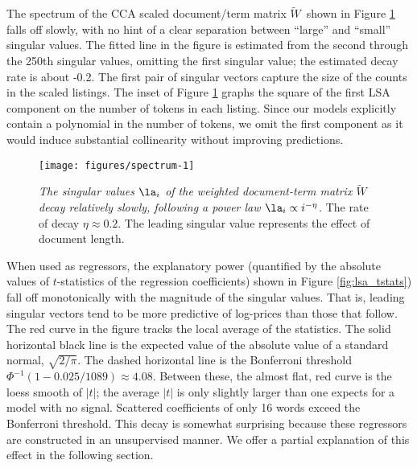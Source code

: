 \documentclass[12pt]{article}\usepackage[]{graphicx}\usepackage[]{color}
\makeatletter
\newenvironment{kframe}{%
 \def\at@end@of@kframe{}%
 \ifinner\ifhmode%
  \def\at@end@of@kframe{\end{minipage}}%
  \begin{minipage}{\columnwidth}%
 \fi\fi%
 \def\FrameCommand##1{\hskip\@totalleftmargin \hskip-\fboxsep
 \colorbox{shadecolor}{##1}\hskip-\fboxsep
     \hskip-\linewidth \hskip-\@totalleftmargin \hskip\columnwidth}%
 \MakeFramed {\advance\hsize-\width
   \@totalleftmargin\z@ \linewidth\hsize
   \@setminipage}}%
 {\par\unskip\endMakeFramed%
 \at@end@of@kframe}
\newenvironment{knitrout}{}{} %
\newcommand{\Wt}{\mbox{$\widetilde{W}$}}
\makeatother
\begin{document}
 The spectrum of the CCA scaled document/term matrix \Wt\ shown in
 Figure \ref{fig:spectrum} falls off slowly, with no hint of a clear
 separation between ``large'' and ``small'' singular values.  The
 fitted line in the figure is estimated from the second through the
 250th singular values, omitting the first singular value; the
 estimated decay rate is about -0.2.  The first pair of singular
 vectors capture the size of the counts in the scaled listings. The
 inset of Figure \ref{fig:spectrum} graphs the square of the first LSA
 component on the number of tokens in each listing.  Since our models
 explicitly contain a polynomial in the number of tokens, we omit the
 first component as it would induce substantial collinearity without
 improving predictions.


\begin{figure}
\begin{knitrout}
\color{fgcolor}

{\centering \texttt{[image: figures/spectrum-1]} 

}


\begin{kframe}

{\ttfamily\noindent\bfseries\color{errorcolor}{\#\# Error in plot.new(): figure margins too large}}\end{kframe}
\end{knitrout}

\caption{ \label{fig:spectrum}
 {\sl The singular values $\la_i$ of the weighted document-term matrix
 $\widetilde{W}$ decay relatively slowly, following a power law $\la_i
 \propto i^{-\eta}$.  } The rate of decay $\eta \approx 0.2$. The
 leading singular value represents the effect of document length. }
\end{figure}


 When used as regressors, the explanatory power (quantified by the
 absolute values of $t$-statistics of the regression coefficients)
 shown in Figure \ref{fig:lsa_tstats}) fall off monotonically with the
 magnitude of the singular values.  That is, leading singular vectors
 tend to be more predictive of log-prices than those that follow.  The
 red curve in the figure tracks the local average of the statistics.
  The solid horizontal black line is the expected value of the
 absolute value of a standard normal, $\sqrt{2/\pi}$. The dashed
 horizontal line is the Bonferroni threshold $\Phi^{-1}(1-0.025/1089)
 \approx 4.08$.  Between these, the almost flat, red curve is the
 loess smooth of $|t|$; the average $|t|$ is only slightly larger than
 one expects for a model with no signal.  Scattered coefficients of
 only 16 words exceed the Bonferroni threshold.  This decay is
 somewhat surprising because these regressors are constructed in an
 unsupervised manner.  We offer a partial explanation of this effect
 in the following section.  \citep[][shows how to use this
 monotonicity to construct more efficient coefficient
 estimates.]{zhuang14}
\end{document}
